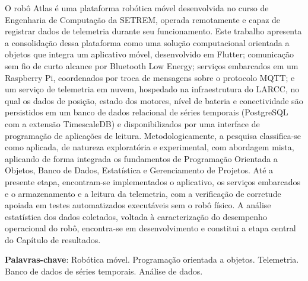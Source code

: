\documentclass[
    12pt,               %
    openany,            %
    oneside,            %
    a4paper,            %
    chapter=TITLE,      %
    section=TITLE,      %
    english,            %
    brazil,             %
    ]{abntex2}
\begin{document}
\frenchspacing

\imprimircapa
\imprimirfolhaderosto

\begin{resumo}
O robô Atlas é uma plataforma robótica móvel desenvolvida no curso de Engenharia de Computação da SETREM, operada remotamente e capaz de registrar dados de telemetria durante seu funcionamento. Este trabalho apresenta a consolidação dessa plataforma como uma solução computacional orientada a objetos que integra um aplicativo móvel, desenvolvido em Flutter; comunicação sem fio de curto alcance por Bluetooth Low Energy; serviços embarcados em um Raspberry Pi, coordenados por troca de mensagens sobre o protocolo MQTT; e um serviço de telemetria em nuvem, hospedado na infraestrutura do LARCC, no qual os dados de posição, estado dos motores, nível de bateria e conectividade são persistidos em um banco de dados relacional de séries temporais (PostgreSQL com a extensão TimescaleDB) e disponibilizados por uma interface de programação de aplicações de leitura. Metodologicamente, a pesquisa classifica-se como aplicada, de natureza exploratória e experimental, com abordagem mista, aplicando de forma integrada os fundamentos de Programação Orientada a Objetos, Banco de Dados, Estatística e Gerenciamento de Projetos. Até a presente etapa, encontram-se implementados o aplicativo, os serviços embarcados e o armazenamento e a leitura da telemetria, com a verificação de corretude apoiada em testes automatizados executáveis sem o robô físico. A análise estatística dos dados coletados, voltada à caracterização do desempenho operacional do robô, encontra-se em desenvolvimento e constitui a etapa central do Capítulo de resultados.

\vspace{\onelineskip}
\noindent\textbf{Palavras-chave}: Robótica móvel. Programação orientada a objetos. Telemetria. Banco de dados de séries temporais. Análise de dados.
\end{resumo}

\listoffigures*
\cleardoublepage

\listoftables*
\cleardoublepage
\end{document}
